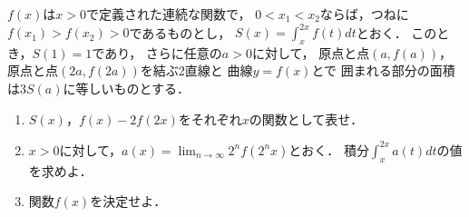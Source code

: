 \documentclass[../../main.tex]{subfiles}
\begin{document}
$f(x)$は$x>0$で定義された連続な関数で，
$0<x_1<x_2$ならば，つねに$f(x_1)>f(x_2)>0$であるものとし，
$\displaystyle S(x)=\int_x^{2x}f(t)dt$とおく．
このとき，$S(1)=1$であり，
さらに任意の$a>0$に対して，
原点と点$(a,f(a))$，原点と点$(2a,f(2a))$を結ぶ2直線と
曲線$y=f(x)$とで
囲まれる部分の面積は$3S(a)$に等しいものとする．
\begin{enumerate}
  \item $S(x)$，$f(x)-2f(2x)$をそれぞれ$x$の関数として表せ．
  \item $x>0$に対して，$\displaystyle a(x)=\lim_{n\to\infty}2^nf(2^nx)$とおく．
    積分$\displaystyle\int_x^{2x}a(t)dt$の値を求めよ．
  \item 関数$f(x)$を決定せよ．
\end{enumerate}
\end{document}
